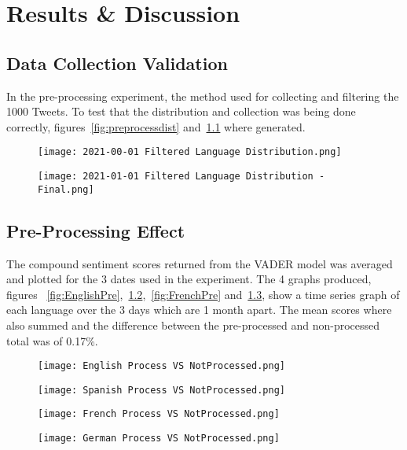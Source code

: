 \chapter{Results \& Discussion}

\section{Data Collection Validation}

In the pre-processing experiment, the method used for collecting and filtering the 1000 Tweets.
To test that the distribution and collection was being done correctly, figures~\ref{fig:preprocessdist} and~\ref{fig:finaldist} where generated.


\begin{figure}[!htb]
  \texttt{[image: 2021-00-01 Filtered Language Distribution.png]}
  \caption{ }
  \label{fig:preprocessdist}
\endminipage\hfill
{}
  \texttt{[image: 2021-01-01 Filtered Language Distribution - Final.png]}
  \caption{ }
  \label{fig:finaldist}
\endminipage
\end{figure}


\section{Pre-Processing Effect}

The compound sentiment scores returned from the \ac{VADER} model was averaged and plotted for the 3 dates used in the experiment.
The 4 graphs produced, figures ~\ref{fig:EnglishPre},~\ref{fig:SpanishPre},~\ref{fig:FrenchPre} and~\ref{fig:GermanPre}, show a time series graph of each language over the 3 days which are 1 month apart.
The mean scores where also summed and the difference between the pre-processed and non-processed total was of 0.17\%.

\begin{figure}[!htb]
  \texttt{[image: English Process VS NotProcessed.png]}
  \caption{ }\label{fig:EnglishPre}
\endminipage\hfill
{}
  \texttt{[image: Spanish Process VS NotProcessed.png]}
  \caption{ }\label{fig:SpanishPre}
\endminipage
\end{figure}
\begin{figure}[!htb]
  \texttt{[image: French Process VS NotProcessed.png]}
  \caption{ }\label{fig:FrenchPre}
\endminipage\hfill
{}%
  \texttt{[image: German Process VS NotProcessed.png]}
  \caption{ }\label{fig:GermanPre}
\endminipage
\end{figure}

